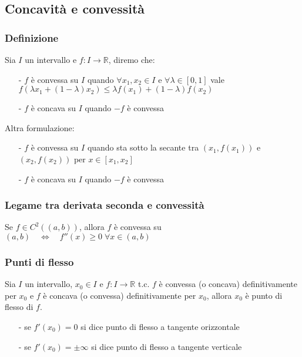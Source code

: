 \documentclass[a4paper]{article}
\newcommand\cont[2]{C^{#1} \left({#2}\right)}
\begin{document}
\subsection{Concavità e convessità}
\subsubsection*{Definizione}
Sia \(I\) un intervallo e \(f:I \to \mathbb{R}\), diremo che:
\begin{itemize} [topsep=3pt, itemsep=0pt]
	\item[-] \(f\) è convessa su \(I\) quando \(\forall x_1, x_2 \in I\) e \(\forall \lambda \in \left[0, 1\right]\) vale
	\(f(\lambda x_1 + \left(1-\lambda\right) x_2) \leq \lambda f(x_1) + \left(1-\lambda\right)f(x_2)\)
	\item[-] \(f\) è concava su \(I\) quando \(-f\) è convessa
\end{itemize}
Altra formulazione:
\begin{itemize} [topsep=3pt, itemsep=0pt]
	\item[-] \(f\) è convessa su \(I\) quando sta sotto la secante tra \(\left(x_1, f(x_1)\right)\) e \(\left(x_2, f(x_2)\right)\) per \(x \in \left[x_1, x_2\right]\)
	\item[-] \(f\) è concava su \(I\) quando \(-f\) è convessa
\end{itemize}

\subsubsection*{Legame tra derivata seconda e convessità}
Se \(f \in \cont{2}{\left(a, b\right)}\), allora \(f\) è convessa su \(\left(a, b\right) \quad \Leftrightarrow \quad f''(x) \geq 0 \; \forall x \in \left(a, b\right)\)

\subsubsection*{Punti di flesso}
Sia \(I\) un intervallo, \(x_0 \in I\) e \(f:I \to \mathbb{R}\) t.c. \(f\) è convessa (o concava) definitivamente per \(x_0\)
e \(f\) è concava (o convessa) definitivamente per \(x_0\), allora \(x_0\) è punto di flesso di \(f\).
\begin{itemize}
	\item[-] se \(f'(x_0) = 0\) si dice punto di flesso a tangente orizzontale
	\item[-] se \(f'(x_0) = \pm \infty\) si dice punto di flesso a tangente verticale
\end{itemize}
\end{document}

